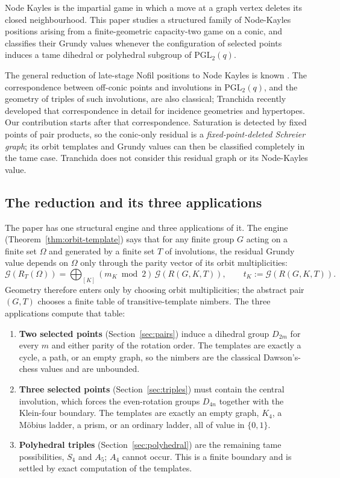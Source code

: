 \documentclass[11pt]{article}
\theoremstyle{definition}
\theoremstyle{remark}
\newcommand{\PGL}{\mathrm{PGL}}
\newcommand{\Grundy}{\mathcal{G}}
\begin{document}
Node Kayles is the impartial game in which a move at a graph vertex deletes its closed
neighbourhood. This paper studies a structured family of Node-Kayles positions arising from a
finite-geometric capacity-two game on a conic, and classifies their Grundy values whenever the
configuration of selected points induces a tame dihedral or polyhedral subgroup of $\PGL_2(q)$.

The general reduction of late-stage Nofil positions to Node Kayles is known
\cite{HugganHuntemannStevens2021}. The correspondence between off-conic points and involutions in
$\PGL_2(q)$, and the geometry of triples of such involutions, are also classical; Tranchida
\cite{Tranchida2025} recently developed that correspondence in detail for incidence geometries and
hypertopes. Our contribution starts after that correspondence. Saturation is detected by fixed
points of pair products, so the conic-only residual is a \emph{fixed-point-deleted Schreier graph};
its orbit templates and Grundy values can then be classified completely in the tame case.
Tranchida does not consider this residual graph or its Node-Kayles value.

\subsection{The reduction and its three applications}

The paper has one structural engine and three applications of it. The engine
(Theorem~\ref{thm:orbit-template}) says that for any finite group $G$ acting on a finite set
$\Omega$ and generated by a finite set $T$ of involutions, the residual Grundy value depends on
$\Omega$ only through the parity vector of its orbit multiplicities:
\[
  \Grundy(R_T(\Omega))
  =\bigoplus_{[K]}(m_K\bmod 2)\,\Grundy(R(G,K,T)),
  \qquad
  t_K:=\Grundy(R(G,K,T)).
\]
Geometry therefore enters only by choosing orbit multiplicities; the abstract pair $(G,T)$ chooses
a finite table of transitive-template nimbers. The three applications compute that table:

\begin{enumerate}[label=(\roman*)]
  \item \textbf{Two selected points} (Section~\ref{sec:pairs}) induce a dihedral group $D_{2m}$ for
    every $m$ and either parity of the rotation order. The templates are exactly a cycle, a path,
    or an empty graph, so the nimbers are the classical Dawson's-chess values and are unbounded.
  \item \textbf{Three selected points} (Section~\ref{sec:triples}) must contain the central
    involution, which forces the even-rotation groups $D_{4n}$ together with the Klein-four
    boundary. The templates are exactly an empty graph, $K_4$, a Möbius ladder, a prism, or an
    ordinary ladder, all of value in $\{0,1\}$.
  \item \textbf{Polyhedral triples} (Section~\ref{sec:polyhedral}) are the remaining tame
    possibilities, $S_4$ and $A_5$; $A_4$ cannot occur. This is a finite boundary and is settled by
    exact computation of the templates.
\end{enumerate}
\end{document}
